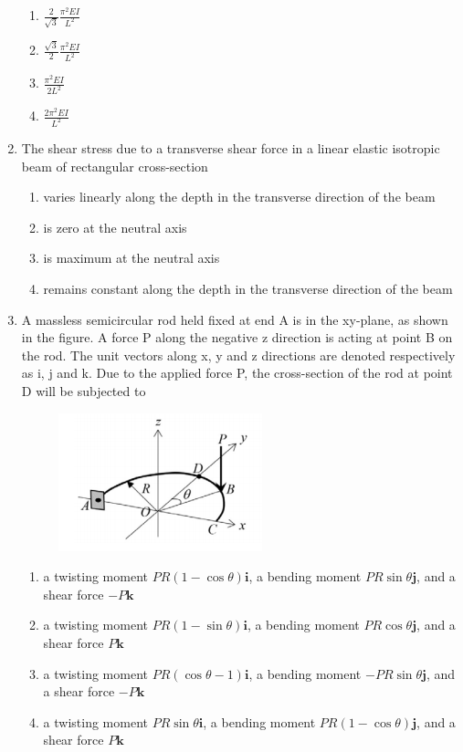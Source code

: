 \documentclass[a4paper,10pt]{article}
\begin{document}
\begin{enumerate}
\hfill{}
\begin{enumerate}
    \item $\frac{2}{\sqrt{3}}\frac{\pi^2 EI}{L^2}$
    \item $\frac{\sqrt{3}}{2}\frac{\pi^2 EI}{L^2}$
    \item $\frac{\pi^2 EI}{2L^2}$
    \item $\frac{2\pi^2 EI}{L^2}$
\end{enumerate}

\item The shear stress due to a transverse shear force in a linear elastic isotropic beam of rectangular cross-section

\hfill{}
\begin{enumerate}
    \item varies linearly along the depth in the transverse direction of the beam
    \item is zero at the neutral axis
    \item is maximum at the neutral axis
    \item remains constant along the depth in the transverse direction of the beam
\end{enumerate}

\item A massless semicircular rod held fixed at end A is in the xy-plane, as shown in the figure. A force P along the negative z direction is acting at point B on the rod. The unit vectors along x, y and z directions are denoted respectively as i, j and k. Due to the applied force P, the cross-section of the rod at point D will be subjected to
\begin{figure}[H]
    \centering
    \includegraphics[width=0.4\columnwidth]{q68.png}
    \caption*{}
    \label{fig:q68}
\end{figure}

\hfill{}
\begin{enumerate}
    \item a twisting moment $PR(1-\cos\theta)\mathbf{i}$, a bending moment $PR\sin\theta\mathbf{j}$, and a shear force $-P\mathbf{k}$
    \item a twisting moment $PR(1-\sin\theta)\mathbf{i}$, a bending moment $PR\cos\theta\mathbf{j}$, and a shear force $P\mathbf{k}$
    \item a twisting moment $PR(\cos\theta-1)\mathbf{i}$, a bending moment $-PR\sin\theta\mathbf{j}$, and a shear force $-P\mathbf{k}$
    \item a twisting moment $PR\sin\theta\mathbf{i}$, a bending moment $PR(1-\cos\theta)\mathbf{j}$, and a shear force $P\mathbf{k}$
\end{enumerate}


\end{enumerate}
\end{document}
